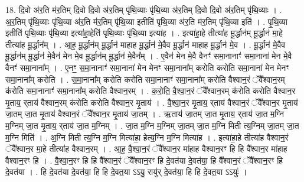 \documentclass[17pt]{extarticle}
\begin{document}
18. दि॒वो अ॑र॒ति म॑र॒तिम् दि॒वो दि॒वो अ॑र॒तिम् पृ॑थि॒व्याः पृ॑थि॒व्या अ॑र॒तिम् दि॒वो दि॒वो अ॑र॒तिम् पृ॑थि॒व्याः । . अ॒र॒तिम् पृ॑थि॒व्याः पृ॑थि॒व्या अ॑र॒ति म॑र॒तिम् पृ॑थि॒व्या इतीति॑ पृथि॒व्या अ॑र॒ति म॑र॒तिम् पृ॑थि॒व्या इति॑ । . पृ॒थि॒व्या इतीति॑ पृथि॒व्याः पृ॑थि॒व्या इत्या॑हा॒हेति॑ पृथि॒व्याः पृ॑थि॒व्या इत्या॑ह । . इत्या॑हा॒हे तीत्या॑ह मू॒र्द्धान॑म् मू॒र्द्धान॑ मा॒हे तीत्या॑ह मू॒र्द्धान᳚म् । . आ॒ह॒ मू॒र्द्धान॑म् मू॒र्द्धान॑ माहाह मू॒र्द्धान॑ मे॒वैव मू॒र्द्धान॑ माहाह मू॒र्द्धान॑ मे॒व । . मू॒र्द्धान॑ मे॒वैव मू॒र्द्धान॑म् मू॒र्द्धान॑ मे॒वैन॑ मेन मे॒व मू॒र्द्धान॑म् मू॒र्द्धान॑ मे॒वैन᳚म् । . ए॒वैन॑ मेन मे॒वै वैनꣳ॑ समा॒नानाꣳ॑ समा॒नाना॑ मेन मे॒वै वैनꣳ॑ समा॒नाना᳚म् । . ए॒नꣳ॒॒ स॒मा॒नानाꣳ॑ समा॒नाना॑ मेन मेनꣳ समा॒नाना᳚म् करोति करोति समा॒नाना॑ मेन मेनꣳ समा॒नाना᳚म् करोति । . स॒मा॒नाना᳚म् करोति करोति समा॒नानाꣳ॑ समा॒नाना᳚म् करोति वैश्वान॒रं ॅवै᳚श्वान॒रम् क॑रोति समा॒नानाꣳ॑ समा॒नाना᳚म् करोति वैश्वान॒रम् । . क॒रो॒ति॒ वै॒श्वा॒न॒रं ॅवै᳚श्वान॒रम् क॑रोति करोति वैश्वान॒र मृ॒ताय॒ र्‌ताय॑ वैश्वान॒रम् क॑रोति करोति वैश्वान॒र मृ॒ताय॑ । . वै॒श्वा॒न॒र मृ॒ताय॒ र्‌ताय॑ वैश्वान॒रं ॅवै᳚श्वान॒र मृ॒ताय॑ जा॒तम् जा॒त मृ॒ताय॑ वैश्वान॒रं ॅवै᳚श्वान॒र मृ॒ताय॑ जा॒तम् । . ऋ॒ताय॑ जा॒तम् जा॒त मृ॒ताय॒ र्‌ताय॑ जा॒त म॒ग्नि म॒ग्निम् जा॒त मृ॒ताय॒ र्‌ताय॑ जा॒त म॒ग्निम् । . जा॒त म॒ग्नि म॒ग्निम् जा॒तम् जा॒त म॒ग्नि मिती त्य॒ग्निम् जा॒तम् जा॒त म॒ग्नि मिति॑ । . अ॒ग्नि मिती त्य॒ग्नि म॒ग्नि मित्या॑हा॒ हेत्य॒ग्नि म॒ग्नि मित्या॑ह । . इत्या॑हा॒हे तीत्या॑ह वैश्वान॒रं ॅवै᳚श्वान॒र मा॒हे तीत्या॑ह वैश्वान॒रम् । . आ॒ह॒ वै॒श्वा॒न॒रं ॅवै᳚श्वान॒र मा॑हाह वैश्वान॒रꣳ हि हि वै᳚श्वान॒र मा॑हाह वैश्वान॒रꣳ हि । . वै॒श्वा॒न॒रꣳ हि हि वै᳚श्वान॒रं ॅवै᳚श्वान॒रꣳ हि दे॒वत॑या दे॒वत॑या॒ हि वै᳚श्वान॒रं ॅवै᳚श्वान॒रꣳ हि दे॒वत॑या । . हि दे॒वत॑या दे॒वत॑या॒ हि हि दे॒वत॒या ऽऽयु॒ रायु॑र् दे॒वत॑या॒ हि हि दे॒वत॒या ऽऽयुः॑ । \newline
\end{document}

